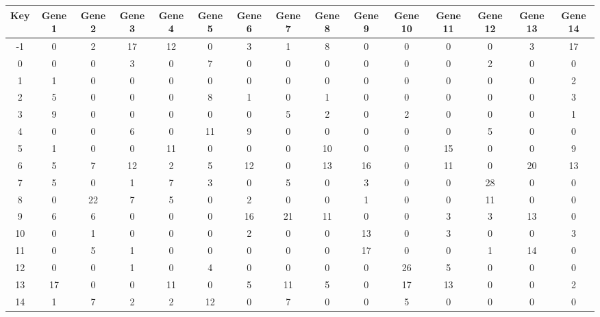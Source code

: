 \begin{tabular}{|c|c|c|c|c|c|c|c|c|c|c|c|c|c|c|}
\hline
Key & Gene 1 & Gene 2 & Gene 3 & Gene 4 & Gene 5 & Gene 6 & Gene 7 & Gene 8 & Gene 9 & Gene 10 & Gene 11 & Gene 12 & Gene 13 & Gene 14 \\
\hline
-1 & 0 & 2 & 17 & 12 & 0 & 3 & 1 & 8 & 0 & 0 & 0 & 0 & 3 & 17 \\
0 & 0 & 0 & 3 & 0 & 7 & 0 & 0 & 0 & 0 & 0 & 0 & 2 & 0 & 0 \\
1 & 1 & 0 & 0 & 0 & 0 & 0 & 0 & 0 & 0 & 0 & 0 & 0 & 0 & 2 \\
2 & 5 & 0 & 0 & 0 & 8 & 1 & 0 & 1 & 0 & 0 & 0 & 0 & 0 & 3 \\
3 & 9 & 0 & 0 & 0 & 0 & 0 & 5 & 2 & 0 & 2 & 0 & 0 & 0 & 1 \\
4 & 0 & 0 & 6 & 0 & 11 & 9 & 0 & 0 & 0 & 0 & 0 & 5 & 0 & 0 \\
5 & 1 & 0 & 0 & 11 & 0 & 0 & 0 & 10 & 0 & 0 & 15 & 0 & 0 & 9 \\
6 & 5 & 7 & 12 & 2 & 5 & 12 & 0 & 13 & 16 & 0 & 11 & 0 & 20 & 13 \\
7 & 5 & 0 & 1 & 7 & 3 & 0 & 5 & 0 & 3 & 0 & 0 & 28 & 0 & 0 \\
8 & 0 & 22 & 7 & 5 & 0 & 2 & 0 & 0 & 1 & 0 & 0 & 11 & 0 & 0 \\
9 & 6 & 6 & 0 & 0 & 0 & 16 & 21 & 11 & 0 & 0 & 3 & 3 & 13 & 0 \\
10 & 0 & 1 & 0 & 0 & 0 & 2 & 0 & 0 & 13 & 0 & 3 & 0 & 0 & 3 \\
11 & 0 & 5 & 1 & 0 & 0 & 0 & 0 & 0 & 17 & 0 & 0 & 1 & 14 & 0 \\
12 & 0 & 0 & 1 & 0 & 4 & 0 & 0 & 0 & 0 & 26 & 5 & 0 & 0 & 0 \\
13 & 17 & 0 & 0 & 11 & 0 & 5 & 11 & 5 & 0 & 17 & 13 & 0 & 0 & 2 \\
14 & 1 & 7 & 2 & 2 & 12 & 0 & 7 & 0 & 0 & 5 & 0 & 0 & 0 & 0 \\
\hline
\end{tabular}